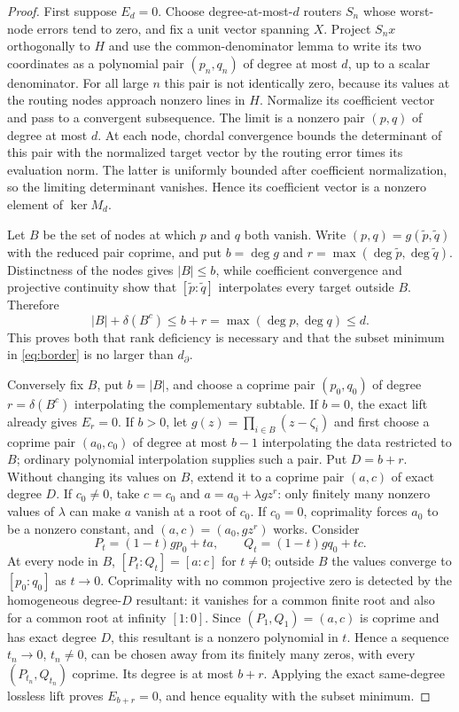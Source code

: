 \documentclass[11pt]{article}
\theoremstyle{definition}\newtheorem{definition}[theorem]{Definition}\newtheorem{example}[theorem]{Example}
\theoremstyle{remark}\newtheorem{remark}[theorem]{Remark}\newtheorem{limitation}[theorem]{Limitation}
\begin{document}
\begin{proof}
First suppose $E_d=0$.  Choose degree-at-most-$d$ routers $S_n$ whose
worst-node errors tend to zero, and fix a unit vector spanning $X$.  Project
$S_nx$ orthogonally to $H$ and use the common-denominator lemma to write its
two coordinates as a polynomial pair $(p_n,q_n)$ of degree at most $d$, up to
a scalar denominator.  For all large $n$ this pair is not identically zero,
because its values at the routing nodes approach nonzero lines in $H$.
Normalize its coefficient vector and pass to a convergent subsequence.  The
limit is a nonzero pair $(p,q)$ of degree at most $d$.
At each node, chordal convergence bounds the determinant of this pair with the
normalized target vector by the routing error times its evaluation norm.  The
latter is uniformly bounded after coefficient normalization, so the limiting
determinant vanishes.  Hence its coefficient vector is a nonzero element of
$\ker M_d$.

Let $B$ be the set of nodes at which $p$ and $q$ both vanish.  Write
$(p,q)=g(\widetilde p,\widetilde q)$ with the reduced pair coprime, and put
$b=\deg g$ and $r=\max(\deg\widetilde p,\deg\widetilde q)$.  Distinctness of
the nodes gives $|B|\le b$, while coefficient convergence and projective
continuity show that $[\widetilde p:\widetilde q]$ interpolates every target
outside $B$.  Therefore
\[
 |B|+\delta(B^c)\le b+r=\max(\deg p,\deg q)\le d.
\]
This proves both that rank deficiency is necessary and that the subset minimum
in \eqref{eq:border} is no larger than $d_\partial$.

Conversely fix $B$, put $b=|B|$, and choose a coprime pair $(p_0,q_0)$ of
degree $r=\delta(B^c)$ interpolating the complementary subtable.  If $b=0$,
the exact lift already gives $E_r=0$.  If $b>0$, let
$g(z)=\prod_{i\in B}(z-\zeta_i)$ and first choose a coprime pair $(a_0,c_0)$
of degree at most $b-1$ interpolating the data restricted to $B$; ordinary
polynomial interpolation supplies such a pair.  Put $D=b+r$.  Without
changing its values on $B$, extend it to a coprime pair $(a,c)$ of exact
degree $D$.  If $c_0\ne0$, take $c=c_0$ and
$a=a_0+\lambda gz^r$: only finitely many nonzero values of $\lambda$ can make
$a$ vanish at a root of $c_0$.  If $c_0=0$, coprimality forces $a_0$ to be a
nonzero constant, and $(a,c)=(a_0,gz^r)$ works.  Consider
\[
 P_t=(1-t)gp_0+ta,\qquad Q_t=(1-t)gq_0+tc.
\]
At every node in $B$, $[P_t:Q_t]=[a:c]$ for $t\ne0$; outside $B$ the values
converge to $[p_0:q_0]$ as $t\to0$.  Coprimality with no common projective
zero is detected by the homogeneous degree-$D$ resultant: it vanishes for a
common finite root and also for a common root at infinity $[1:0]$.  Since
$(P_1,Q_1)=(a,c)$ is coprime and has exact degree $D$, this resultant is a
nonzero polynomial in $t$.  Hence a sequence $t_n\to0$, $t_n\ne0$, can be
chosen away from its finitely many zeros, with every $(P_{t_n},Q_{t_n})$
coprime.  Its degree is at most $b+r$.  Applying the exact same-degree
lossless lift proves $E_{b+r}=0$, and hence equality with the subset minimum.


\end{proof}
\end{document}
